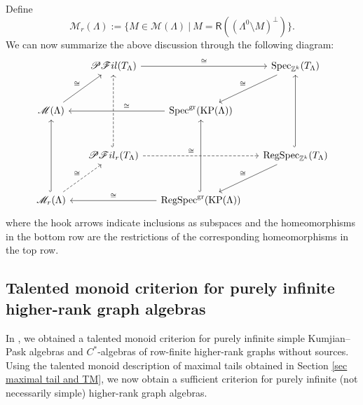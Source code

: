 \documentclass[a4paper,reqno,12pt]{amsart}
\numberwithin{equation}{section}
\theoremstyle{definition}
\theoremstyle{remark}
\newcommand{\KP}{\operatorname{KP}}
\begin{document}
Define \[\mathscr{M}_r(\Lambda):=\{M\in \mathscr{M}(\Lambda)~|~M=\mathsf{R}\left((\Lambda^0\setminus M)^\perp\right)\}.\] We can now summarize the above discussion through the following diagram:  
\[
\begin{tikzcd}[row sep=1cm, column sep=0.5cm]
& \mathscr{P}\mathscr{F}il(T_\Lambda) \arrow[rr, "\cong"] 
& & \mathrm{Spec}_{\mathbb{Z}^k}(T_\Lambda) \arrow[dl, "\cong"'] \\
\mathscr{M}(\Lambda) \arrow[ur, "\cong"]  
& & \mathrm{Spec}^{\mathrm{gr}}(\KP(\Lambda)) \arrow[ll, "\cong"'{xshift=10pt}] \\
& \mathscr{P}\mathscr{F}il_r(T_\Lambda) \arrow[rr, dashed, "\cong"{xshift=-10pt}] \arrow[uu, hook, dashed] 
& & \mathrm{RegSpec}_{\mathbb{Z}^k}(T_\Lambda) \arrow[uu, hook] \arrow[dl, "\cong"']\\
\mathscr{M}_r(\Lambda) \arrow[uu, hook] \arrow[ur, dashed, "\cong"] 
& & \mathrm{RegSpec}^{\mathrm{gr}}(\KP(\Lambda)) \arrow[ll, "\cong"'] \arrow[uu, hook] 
\end{tikzcd}
\]
where the hook arrows indicate inclusions as subspaces and the homeomorphisms in the bottom row are the restrictions of the corresponding homeomorphisms in the top row.

\subsection{Talented monoid criterion for purely infinite higher-rank graph algebras} In \cite{HLM}, we obtained a talented monoid criterion for purely infinite simple Kumjian--Pask algebras and $C^*$-algebras of row-finite higher-rank graphs without sources. Using the talented monoid description of maximal tails obtained in Section \ref{sec maximal tail and TM}, we now obtain a sufficient criterion for purely infinite (not necessarily simple) higher-rank graph algebras. 
\end{document}
